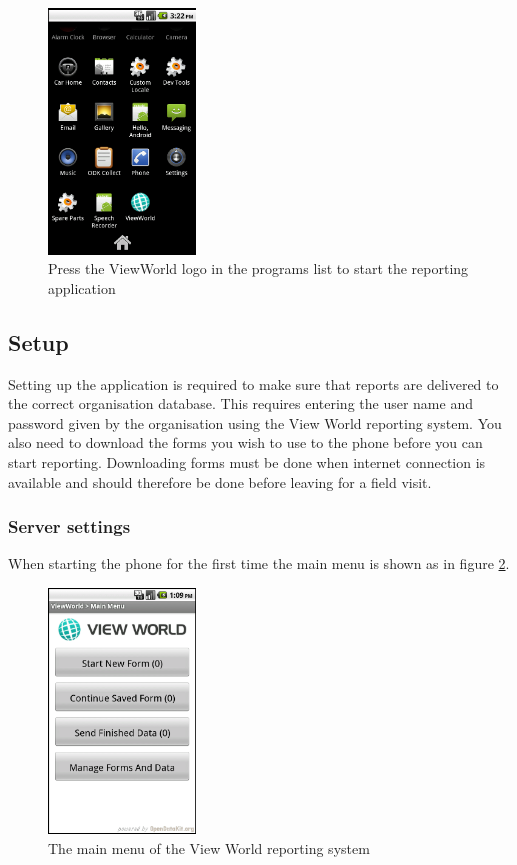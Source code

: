 \documentclass[a4paper, 12pt, final]{article}
\begin{document}
\begin{figure}[h!]
  \centering
      \includegraphics[width=0.35\textwidth]{pics/vw_app_icon.png}
  \caption{Press the ViewWorld logo in the programs list to start the reporting application}
  \label{fig:vw_app_icon}
\end{figure}

\subsection{Setup}

Setting up the application is required to make sure that reports are delivered to the correct organisation database. This requires entering the user name and password given by the organisation using the View World reporting system. You also need to download the forms you wish to use to the phone before you can start reporting. Downloading forms must be done when internet connection is available and should therefore be done before leaving for a field visit.

\subsubsection{Server settings}

When starting the phone for the first time the main menu is shown as in figure \ref{fig:front_screen}.

\begin{figure}[h!]
  \centering
      \includegraphics[width=0.35\textwidth]{pics/vw_front_screen.png}
  \caption{The main menu of the View World reporting system}
  \label{fig:front_screen}
\end{figure}
\end{document}
